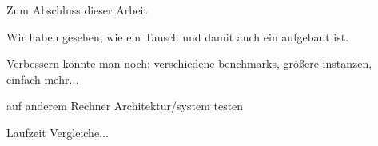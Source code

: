 Zum Abschluss dieser Arbeit





Wir haben gesehen, wie ein \gc{} Tausch und damit auch ein \ct{} aufgebaut ist. 





Verbessern könnte man noch:
verschiedene benchmarks, größere instanzen, einfach mehr...

auf anderem Rechner Architektur/system testen 



Laufzeit Vergleiche...
